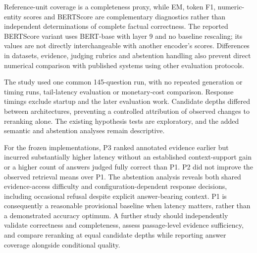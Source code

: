 Reference-unit coverage is a completeness proxy, while EM, token F1,
numeric-entity scores and BERTScore are complementary diagnostics rather than
independent determinations of complete factual correctness. The reported
BERTScore variant uses BERT-base with layer 9 and no baseline rescaling;
its values are not directly interchangeable with another encoder's scores.
Differences in datasets, evidence, judging rubrics and abstention handling
also prevent direct numerical comparison with published systems using other
evaluation protocols.

The study used one common 145-question run, with no repeated generation or
timing runs, tail-latency evaluation or monetary-cost comparison. Response
timings exclude startup and the later evaluation work. Candidate depths
differed between architectures, preventing a controlled attribution of
observed changes to reranking alone. The existing hypothesis tests are
exploratory, and the added semantic and abstention analyses remain descriptive.

For the frozen implementations, P3 ranked annotated evidence earlier but
incurred substantially higher latency without an established context-support
gain or a higher count of answers judged fully correct than P1. P2 did not
improve the observed retrieval means over P1. The abstention analysis reveals
both shared evidence-access difficulty and configuration-dependent response
decisions, including occasional refusal despite explicit answer-bearing
context. P1 is consequently a reasonable provisional baseline when latency
matters, rather than a demonstrated accuracy optimum. A further study should
independently validate correctness and completeness, assess passage-level
evidence sufficiency, and compare reranking at equal candidate depths while
reporting answer coverage alongside conditional quality.
